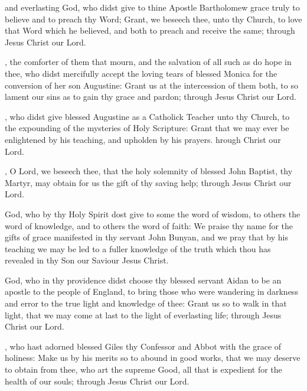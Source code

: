  and everlasting God, who didst give to thine Apostle Bartholomew grace truly to believe and to preach thy Word; Grant, we beseech thee, unto thy Church, to love that Word which he believed, and both to preach and receive the same; through Jesus Christ our Lord.

, the comforter of them that mourn, and the salvation of all such as do hope in thee, who didst mercifully accept the loving tears of blessed Monica for the conversion of her son Augustine: Grant us at the intercession of them both, to so lament our sins as to gain thy grace and pardon; through Jesus Christ our Lord.

, who didst give blessed Augustine as a Catholick Teacher unto thy Church, to the expounding of the mysteries of Holy Scripture: Grant that we may ever be enlightened by his teaching, and upholden by his prayers. hrough Christ our Lord.

, O Lord, we beseech thee, that the holy solemnity of blessed John Baptist, thy Martyr, may obtain for us the gift of thy saving help; through Jesus Christ our Lord.

 God, who by thy Holy Spirit dost give to some the word of wisdom, to others the word of knowledge, and to others the word of faith: We praise thy name for the gifts of grace manifested in thy servant John Bunyan, and we pray that by his teaching we may be led to a fuller knowledge of the truth which thou has revealed in thy Son our Saviour Jesus Christ.

 God, who in thy providence didst choose thy blessed servant Aidan to be an apostle to the people of England, to bring those who were wandering in darkness and error to the true light and knowledge of thee: Grant us so to walk in that light, that we may come at last to the light of everlasting life; through Jesus Christ our Lord.

, who hast adorned blessed Giles thy Confessor and Abbot with the grace of holiness: Make us by his merits so to abound in good works, that we may deserve to obtain from thee, who art the supreme Good, all that is expedient for the health of our souls; through Jesus Christ our Lord.

